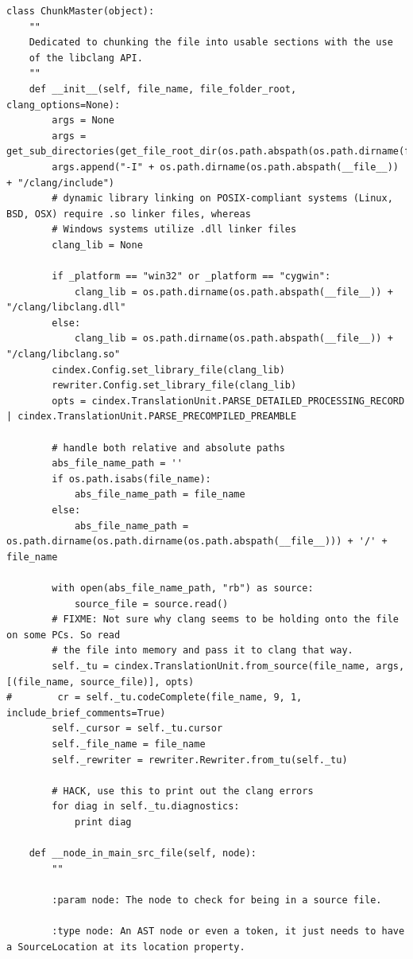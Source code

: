 \documentclass[11pt]{scrreprt}
\begin{document}
\begin{lstlisting}[frame=single,basicstyle=\small]
class ChunkMaster(object):
    ""
    Dedicated to chunking the file into usable sections with the use
    of the libclang API.
    ""
    def __init__(self, file_name, file_folder_root, clang_options=None):
        args = None
        args = get_sub_directories(get_file_root_dir(os.path.abspath(os.path.dirname(file_name))))
        args.append("-I" + os.path.dirname(os.path.abspath(__file__)) + "/clang/include")
        # dynamic library linking on POSIX-compliant systems (Linux, BSD, OSX) require .so linker files, whereas
        # Windows systems utilize .dll linker files
        clang_lib = None

        if _platform == "win32" or _platform == "cygwin":
            clang_lib = os.path.dirname(os.path.abspath(__file__)) + "/clang/libclang.dll"
        else:
            clang_lib = os.path.dirname(os.path.abspath(__file__)) + "/clang/libclang.so"
        cindex.Config.set_library_file(clang_lib)
        rewriter.Config.set_library_file(clang_lib)
        opts = cindex.TranslationUnit.PARSE_DETAILED_PROCESSING_RECORD | cindex.TranslationUnit.PARSE_PRECOMPILED_PREAMBLE

        # handle both relative and absolute paths
        abs_file_name_path = ''
        if os.path.isabs(file_name):
            abs_file_name_path = file_name
        else:
            abs_file_name_path = os.path.dirname(os.path.dirname(os.path.abspath(__file__))) + '/' + file_name

        with open(abs_file_name_path, "rb") as source:
            source_file = source.read()
        # FIXME: Not sure why clang seems to be holding onto the file on some PCs. So read
        # the file into memory and pass it to clang that way.
        self._tu = cindex.TranslationUnit.from_source(file_name, args, [(file_name, source_file)], opts)
#        cr = self._tu.codeComplete(file_name, 9, 1, include_brief_comments=True)
        self._cursor = self._tu.cursor
        self._file_name = file_name
        self._rewriter = rewriter.Rewriter.from_tu(self._tu)

        # HACK, use this to print out the clang errors
        for diag in self._tu.diagnostics:
            print diag

    def __node_in_main_src_file(self, node):
        ""

        :param node: The node to check for being in a source file.

        :type node: An AST node or even a token, it just needs to have a SourceLocation at its location property.


\end{lstlisting}
\end{document}
